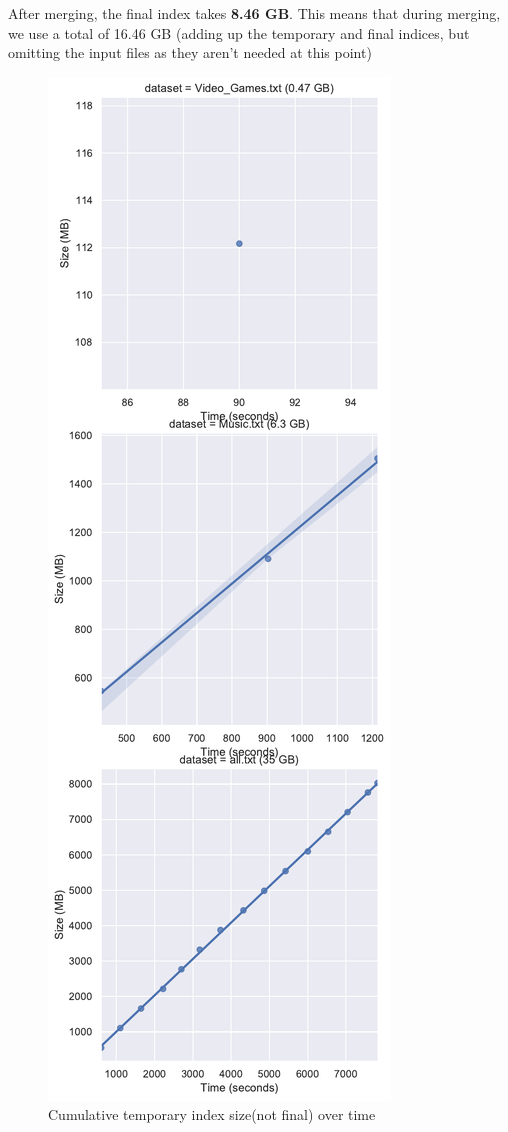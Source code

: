\documentclass[11pt]{article}
\begin{document}
After merging, the final index takes \textbf{8.46 GB}. This means that during merging, we use a total of 16.46 GB (adding up the temporary and final indices, but omitting the input files as they aren't needed at this point)

\begin{figure}[!htb]
	\caption{Cumulative temporary index size(not final) over time}
	\label{fig:cumsize}
	\centering
	\includegraphics[width=\textwidth,height=\textheight,keepaspectratio]{diskusage.pdf}
\end{figure}
\end{document}

